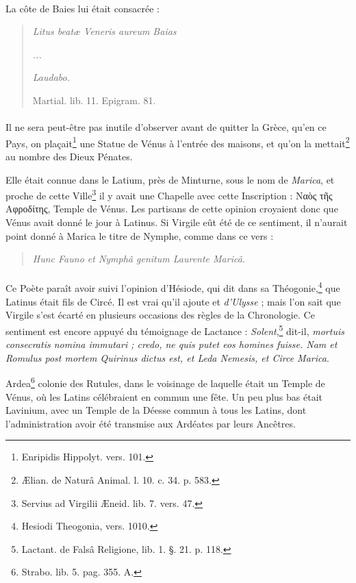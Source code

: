 \documentclass[a4paper, 11pt, oneside, polutonikogreek, french]{article}
\begin{document}
\paragraph{}
La côte de Baies lui était consacrée :
\begin{quotation}
\emph{Litus beatæ Veneris aureum Baias}

\emph{...}

\emph{Laudabo.}

\hspace*{30mm}Martial. lib. 11. Epigram. 81.
\end{quotation}
\paragraph{}
Il ne sera peut-être pas inutile d'observer avant de quitter la Grèce, qu'en ce Pays, on plaçait\footnote{Enripidis Hippolyt. vers. 101.} une Statue de Vénus à l'entrée des maisons, et qu'on la mettait\footnote{Ælian. de Naturâ Animal. l. 10. c. 34. p. 583.} au nombre des Dieux Pénates.

Elle était connue dans le Latium, près de Minturne, sous le nom de \emph{Marica}, et proche de cette Ville\footnote{Servius ad Virgilii Æneid. lib. 7. vers. 47.} il y avait une Chapelle avec cette Inscription : Ναὸς τῆς Αφροδίτης, Temple de Vénus. Les partisans de cette opinion croyaient donc que Vénus avait donné le jour à Latinus. Si Virgile eût été de ce sentiment, il n'aurait point donné à Marica le titre de Nymphe, comme dans ce vers :
\begin{quotation}
\emph{Hunc Fauno et Nymphâ genitum Laurente Maricâ.}
\end{quotation}
\paragraph{}
Ce Poète paraît avoir suivi l'opinion d'Hésiode, qui dit dans sa Théogonie,\footnote{Hesiodi Theogonia, vers. 1010.} que Latinus était fils de Circé. Il est vrai qu'il ajoute et \emph{d'Ulysse} ; mais l'on sait que Virgile s'est écarté en plusieurs occasions des règles de la Chronologie. Ce sentiment est encore appuyé du témoignage de Lactance : \emph{Solent},\footnote{Lactant. de Falsâ Religione, lib. 1. §. 21. p. 118.} dit-il, \emph{mortuis consecratis nomina immutari ; credo, ne quis putet eos homines fuisse. Nam et Romulus post mortem Quirinus dictus est, et Leda Nemesis, et Circe Marica}.

Ardea\footnote{Strabo. lib. 5. pag. 355. A.} colonie des Rutules, dans le voisinage de laquelle était un Temple de Vénus, où les Latins célébraient en commun une fête. Un peu plus bas était Lavinium, avec un Temple de la Déesse commun à tous les Latins, dont l'administration avoir été transmise aux Ardéates par leurs Ancêtres.
\end{document}
